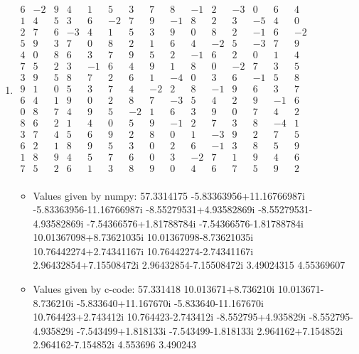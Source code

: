 \documentclass[a4paper, 14pt]{article}
\begin{document}
\begin{enumerate}
\item $\begin{array}{ccccccccccccccc}
6 & -2 & 9 & 4 & 1 & 5 & 3 & 7 & 8 & -1 & 2 & -3 & 0 & 6 & 4 \\
1 & 4 & 5 & 3 & 6 & -2 & 7 & 9 & -1 & 8 & 2 & 3 & -5 & 4 & 0 \\
2 & 7 & 6 & -3 & 4 & 1 & 5 & 3 & 9 & 0 & 8 & 2 & -1 & 6 & -2 \\
5 & 9 & 3 & 7 & 0 & 8 & 2 & 1 & 6 & 4 & -2 & 5 & -3 & 7 & 9 \\
4 & 0 & 8 & 6 & 3 & 7 & 9 & 5 & 2 & -1 & 6 & 2 & 0 & 1 & 4 \\
7 & 5 & 2 & 3 & -1 & 6 & 4 & 9 & 1 & 8 & 0 & -2 & 7 & 3 & 5 \\
3 & 9 & 5 & 8 & 7 & 2 & 6 & 1 & -4 & 0 & 3 & 6 & -1 & 5 & 8 \\
9 & 1 & 0 & 5 & 3 & 7 & 4 & -2 & 2 & 8 & -1 & 9 & 6 & 3 & 7 \\
6 & 4 & 1 & 9 & 0 & 2 & 8 & 7 & -3 & 5 & 4 & 2 & 9 & -1 & 6 \\
0 & 8 & 7 & 4 & 9 & 5 & -2 & 1 & 6 & 3 & 9 & 0 & 7 & 4 & 2 \\
8 & 6 & 2 & 1 & 4 & 0 & 5 & 9 & -1 & 2 & 7 & 3 & 8 & -4 & 1 \\
3 & 7 & 4 & 5 & 6 & 9 & 2 & 8 & 0 & 1 & -3 & 9 & 2 & 7 & 5 \\
6 & 2 & 1 & 8 & 9 & 5 & 3 & 0 & 2 & 6 & -1 & 3 & 8 & 5 & 9 \\
1 & 8 & 9 & 4 & 5 & 7 & 6 & 0 & 3 & -2 & 7 & 1 & 9 & 4 & 6 \\
7 & 5 & 2 & 6 & 1 & 3 & 8 & 9 & 0 & 4 & 6 & 7 & 5 & 9 & 2 \\
\end{array}$
\begin{itemize}
	\item Values given by numpy: 57.3314175  -5.83363956+11.16766987i  -5.83363956-11.16766987i  -8.55279531+4.93582869i  -8.55279531-4.93582869i  -7.54366576+1.81788784i  -7.54366576-1.81788784i  10.01367098+8.73621035i  10.01367098-8.73621035i  10.76442274+2.74341167i  10.76442274-2.74341167i  2.96432854+7.15508472i  2.96432854-7.15508472i  3.49024315  4.55369607
	\item Values given by c-code: 57.331418  10.013671+8.736210i  10.013671-8.736210i  -5.833640+11.167670i  -5.833640-11.167670i  10.764423+2.743412i  10.764423-2.743412i  -8.552795+4.935829i  -8.552795-4.935829i  -7.543499+1.818133i  -7.543499-1.818133i  2.964162+7.154852i  2.964162-7.154852i  4.553696  3.490243  
\end{itemize}
\end{enumerate}


\end{document}
